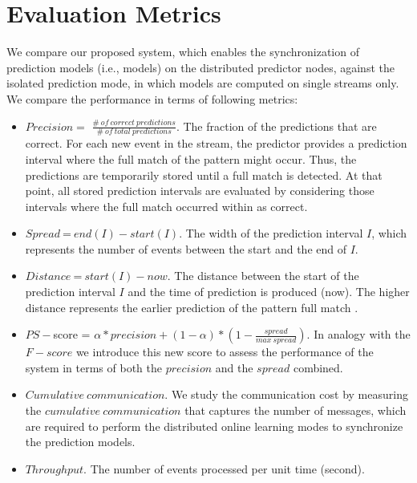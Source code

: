 \section{Evaluation Metrics} 
\label{sec:metrics}
\par We compare our proposed system, which enables the synchronization of prediction models (i.e., \pmcmr models) on the distributed predictor nodes,  against the isolated prediction mode, in which models are computed on single streams only. We compare the performance in terms of following metrics:
\begin{itemize}	
	\item  $\mathit{Precision} =$ $ \mathit{\frac{\#\ of\ correct\ predictions}{\#\ of\ total\ predictions}}$. The fraction of the predictions that are correct. For each new event in the stream, the predictor provides a prediction interval where the full match of the pattern might occur. Thus, the predictions are temporarily stored until a full match is detected. At that point, all stored prediction intervals are evaluated by considering those intervals where the full match occurred within as correct.     
	\item $\mathit{Spread}\ $=$\ end(I) -start(I)$. The width of the prediction interval $I$, which represents the number of events between the start and the end of $I$.
	\item $\mathit{Distance}\ $=$\ start(I) - now$. The distance between the start of the prediction interval $I$ and the time of prediction is produced (now). The  higher distance represents the earlier prediction of the pattern full match \cite{alevizos2017event}.  
		
	\item $\mathit{PS-}$score = $\alpha * precision + (1 - \alpha ) * ( 1- \frac{spread}{max\  spread})$. In analogy with the $F-score$ we introduce this new score to assess the performance of the system in terms of both the $\mathit{precision}$ and the $\mathit{spread}$ combined.
	\item  $\mathit{Cumulative\ communication}$. We study the communication cost by measuring the $\mathit{cumulative\ communication}$ that captures the number of messages, which are required to perform the distributed online learning modes to synchronize the prediction models.	
\item $Throughput$. The number of events processed per unit time (second).
\end{itemize} 

